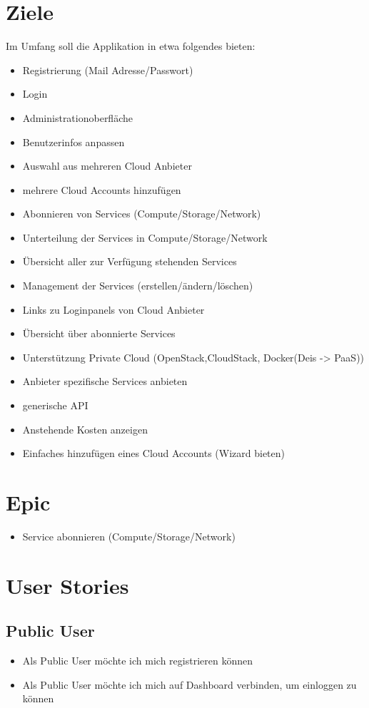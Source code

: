 \documentclass[11pt]{scrartcl}
\begin{document}
\section{Ziele}
Im Umfang soll die Applikation in etwa folgendes bieten:
\begin{itemize}
  \item Registrierung (Mail Adresse/Passwort)
  \item Login
  \item Administrationoberfläche
  \item Benutzerinfos anpassen
  \item Auswahl aus mehreren Cloud Anbieter
  \item mehrere Cloud Accounts hinzufügen
  \item Abonnieren von Services (Compute/Storage/Network)
  \item Unterteilung der Services in Compute/Storage/Network
  \item Übersicht aller zur Verfügung stehenden Services
  \item Management der Services (erstellen/ändern/löschen)
  \item Links zu Loginpanels von Cloud Anbieter
  \item Übersicht über abonnierte Services
  \item Unterstützung Private Cloud (OpenStack,CloudStack, Docker(Deis -> PaaS))
  \item Anbieter spezifische Services anbieten
  \item generische API
  \item Anstehende Kosten anzeigen
  \item Einfaches hinzufügen eines Cloud Accounts (Wizard bieten)
\end{itemize}


\section{Epic}
\begin{itemize}
  \item Service abonnieren (Compute/Storage/Network)
\end{itemize}

\section{User Stories}

\subsection{Public User}
\begin{itemize}
  \item Als Public User möchte ich mich registrieren können
  \item Als Public User möchte ich mich auf Dashboard verbinden, um einloggen zu 
  können
\end{itemize}
\end{document}
